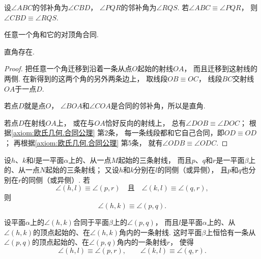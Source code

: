 \begin{theorem}\label{theorem:欧氏几何.定理14}
设\(\angle ABC\)的邻补角为\(\angle CBD\)，
\(\angle PQR\)的邻补角为\(\angle RQS\).
若\(\angle ABC \equiv \angle PQR\)，
则\(\angle CBD \equiv \angle RQS\).
\end{theorem}

\begin{corollary}\label{theorem:欧氏几何.对顶角合同}
任意一个角和它的对顶角合同.
\end{corollary}

\begin{corollary}\label{theorem:欧氏几何.直角存在}
直角存在.
\begin{proof}
把任意一个角迁移到沿着一条从点\(O\)起始的射线\(OA\)，
而且迁移到这射线的两侧.
在新得到的这两个角的另外两条边上，
取线段\(OB \equiv OC\)，
线段\(BC\)交射线\(OA\)于一点\(D\).

若点\(D\)就是点\(O\)，
\(\angle BOA\)和\(\angle COA\)是合同的邻补角，所以是直角.

若点\(D\)在射线\(OA\)上，
或在与\(OA\)恰好反向的射线上，
总有\(\angle DOB \equiv \angle DOC\)；
根据\cref{axiom:欧氏几何.合同公理} 第2条，
每一条线段都和它自己合同，即\(OD \equiv OD\)；
再根据\cref{axiom:欧氏几何.合同公理} 第5条，
就有\(\angle ODB \equiv \angle ODC\).
\end{proof}
\end{corollary}

\begin{theorem}\label{theorem:欧氏几何.定理15}
设\(h\)、\(k\)和\(l\)是一平面\(\alpha\)上的、从一点\(M\)起始的三条射线，
而且\(p\)、\(q\)和\(r\)是一平面\(\beta\)上的、从一点\(N\)起始的三条射线；%
又设\(h\)和\(k\)分别在\(l\)的同侧（或异侧），
且\(p\)和\(q\)也分别在\(r\)的同侧（或异侧）.
若
\begin{equation*}
\angle(h,l) \equiv \angle(p,r)
\quad\text{且}\quad
\angle(k,l) \equiv \angle(q,r),
\end{equation*}
则
\begin{equation*}
\angle(h,k) \equiv \angle(p,q).
\end{equation*}
\end{theorem}

\begin{theorem}\label{theorem:欧氏几何.定理16}
设平面\(\alpha\)上的\(\angle(h,k)\)合同于平面\(\beta\)上的\(\angle(p,q)\)，
而且\(l\)是平面\(\alpha\)上的、从\(\angle(h,k)\)的顶点起始的、在\(\angle(h,k)\)角内的一条射线.
这时平面\(\beta\)上恒恰有一条从\(\angle(p,q)\)的顶点起始的、在\(\angle(p,q)\)角内的一条射线\(r\)，
使得
\begin{equation*}
\angle(h,l) \equiv \angle(p,r), \qquad
\angle(k,l) \equiv \angle(q,r).
\end{equation*}
\end{theorem}

